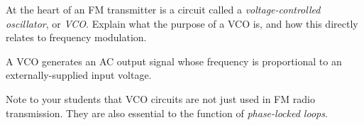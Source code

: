 

At the heart of an FM transmitter is a circuit called a {\it voltage-controlled oscillator}, or {\it VCO}.  Explain what the purpose of a VCO is, and how this directly relates to frequency modulation.







A VCO generates an AC output signal whose frequency is proportional to an externally-supplied input voltage.







Note to your students that VCO circuits are not just used in FM radio transmission.  They are also essential to the function of {\it phase-locked loops}.




